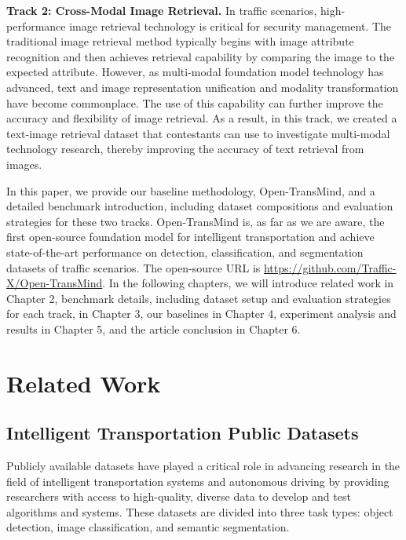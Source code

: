 \documentclass[10pt,twocolumn,letterpaper]{article}
\begin{document}
\textbf{Track 2: Cross-Modal Image Retrieval. }In traffic scenarios, high-performance image retrieval technology is critical for security management. The traditional image retrieval method typically begins with image attribute recognition and then achieves retrieval capability by comparing the image to the expected attribute. However, as multi-modal foundation model technology has advanced, text and image representation unification and modality transformation have become commonplace. The use of this capability can further improve the accuracy and flexibility of image retrieval. As a result, in this track, we created a text-image retrieval dataset that contestants can use to investigate multi-modal technology research, thereby improving the accuracy of text retrieval from images.



In this paper, we provide our baseline methodology, Open-TransMind, and a detailed benchmark introduction, including dataset compositions and evaluation strategies for these two tracks. Open-TransMind is, as far as we are aware, the first open-source foundation model for intelligent transportation and achieve state-of-the-art performance on detection, classification, and segmentation datasets of traffic scenarios. The open-source URL is \url{https://github.com/Traffic-X/Open-TransMind}. In the following chapters, we will introduce related work in Chapter 2, benchmark details, including dataset setup and evaluation strategies for each track, in Chapter 3, our baselines in Chapter 4, experiment analysis and results in Chapter 5, and the article conclusion in Chapter 6.









\section{Related Work}
\label{sec:formatting}
\subsection{Intelligent Transportation Public Datasets}
Publicly available datasets have played a critical role in advancing research in the field of intelligent transportation systems and autonomous driving by providing researchers with access to high-quality, diverse data to develop and test algorithms and systems. These datasets are divided into three task types: object detection, image classification, and semantic segmentation.
\end{document}
